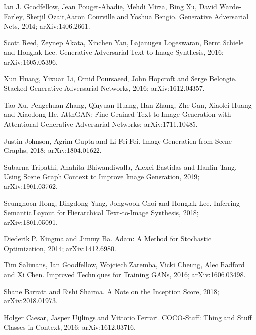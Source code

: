 \documentclass{article}
\begin{document}

\begin{thebibliography}{1}

\medskip
\small

Ian J. Goodfellow,
Jean Pouget-Abadie, Mehdi Mirza, Bing Xu, David Warde-Farley, Sherjil Ozair,Aaron Courville and Yoshua Bengio.
\newblock Generative Adversarial Nets, 2014;
\newblock arXiv:1406.2661.

Scott Reed, Zeynep Akata, Xinchen Yan, Lajanugen Logeswaran, Bernt Schiele and Honglak Lee.
\newblock Generative Adversarial Text to Image Synthesis, 2016;
\newblock arXiv:1605.05396.

Xun Huang, Yixuan Li, Omid Poursaeed, John Hopcroft and Serge Belongie.
\newblock Stacked Generative Adversarial Networks, 2016;
\newblock arXiv:1612.04357.

Tao Xu, Pengchuan Zhang, Qiuyuan Huang,
Han Zhang, Zhe Gan, Xiaolei Huang and Xiaodong He.
\newblock AttnGAN: Fine-Grained Text to Image Generation with Attentional Generative Adversarial Networks;
\newblock arXiv:1711.10485.


Justin Johnson, Agrim Gupta and Li Fei-Fei.
\newblock Image Generation from Scene Graphs, 2018;
\newblock arXiv:1804.01622.

Subarna Tripathi, Anahita Bhiwandiwalla, Alexei Bastidas and Hanlin Tang.
\newblock Using Scene Graph Context to Improve Image Generation, 2019;
\newblock arXiv:1901.03762.

Seunghoon Hong, Dingdong Yang, Jongwook Choi and Honglak Lee.
\newblock Inferring Semantic Layout for Hierarchical Text-to-Image Synthesis, 2018;
\newblock arXiv:1801.05091.

Diederik P. Kingma and Jimmy Ba.
\newblock Adam: A Method for Stochastic Optimization, 2014;
\newblock arXiv:1412.6980.

Tim Salimans, Ian Goodfellow, Wojciech Zaremba, Vicki Cheung, Alec Radford and Xi Chen.
\newblock Improved Techniques for Training GANs, 2016;
\newblock arXiv:1606.03498.

Shane Barratt and Eishi Sharma.
\newblock A Note on the Inception Score, 2018;
\newblock arXiv:2018.01973.

Holger Caesar, Jasper Uijlings and Vittorio Ferrari.
\newblock COCO-Stuff: Thing and Stuff Classes in Context, 2016;
\newblock arXiv:1612.03716.


\end{thebibliography}
\end{document}
